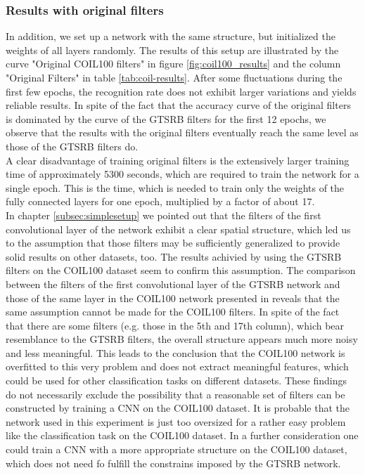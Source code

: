 \documentclass[11pt, a4paper]{article}
\begin{document}
\subsubsection{Results with original filters}

In addition, we set up a network with the same structure, but initialized the weights of all layers randomly. The results of this setup are illustrated by the curve "Original COIL100 filters" in figure \ref{fig:coil100_results} and the column "Original Filters" in table \ref{tab:coil-results}. After some fluctuations during the first few epochs, the recognition rate does not exhibit larger variations and yields reliable results. In spite of the fact that the accuracy curve of the original filters is dominated by the curve of the GTSRB filters for the first 12 epochs, we observe that the results with the original filters eventually reach the same level as those of the GTSRB filters do.\\
A clear disadvantage of training original filters is the extensively larger training time of approximately 5300 seconds, which are required to train the network for a single epoch. This is the time, which is needed to train only the weights of the fully connected layers for one epoch, multiplied by a factor of about 17.\\
In chapter \ref{subsec:simplesetup} we pointed out that the filters of the first convolutional layer of the  network exhibit a clear spatial structure, which led us to the assumption that those filters may be sufficiently generalized to provide solid results on other datasets, too. The results achivied by using the GTSRB filters on the COIL100 dataset seem to confirm this assumption. The comparison between the filters of the first convolutional layer of the GTSRB network and those of the same layer in the COIL100 network presented in  reveals that the same assumption cannot be made for the COIL100 filters. In spite of the fact that there are some filters (e.g. those in the 5th and 17th column), which bear resemblance to the GTSRB filters, the overall structure appears much more noisy and less meaningful. This leads to the conclusion that the COIL100 network is overfitted to this very problem and does not extract meaningful features, which could be used for other classification tasks on different datasets. These findings do not necessarily exclude the possibility that a reasonable set of filters can be constructed by training a CNN on the COIL100 dataset. It is probable that the network used in this experiment is just too oversized for a rather easy problem like the classification task on the COIL100 dataset. In a further consideration one could train a CNN with a more appropriate structure on the COIL100 dataset, which does not need fo fulfill the constrains imposed by the GTSRB network.\\
\end{document}
